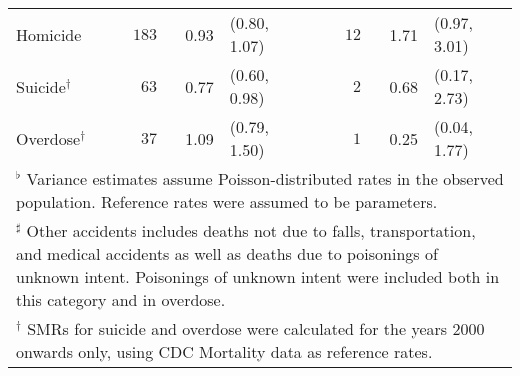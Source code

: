\documentclass[]{article}
\begin{document}
\begin{table}[H]
\begin{tabular}{lrrlcrrl}
  \hspace{10pt}Homicide & $183$ & 0.93 &  (0.80, 1.07) &  & $12$ & 1.71 &  (0.97, 3.01) \\ 
  \hspace{10pt}Suicide$^\dagger$ & $63$ & 0.77 &  (0.60, 0.98) &  & $2$ & 0.68 &  (0.17, 2.73) \\ 
  \hspace{10pt}Overdose$^\dagger$ & $37$ & 1.09 &  (0.79, 1.50) &  & $1$ & 0.25 &  (0.04, 1.77) \\ 
   \hline 
\multicolumn{8}{p{0.95\textwidth}}{\footnotesize$^\flat$ Variance estimates assume Poisson-distributed rates in the observed population. Reference rates were assumed to be parameters.}\\ 
\multicolumn{8}{p{0.95\textwidth}}{\footnotesize$^\sharp$ Other accidents includes deaths not due to falls, transportation, and medical accidents as well as deaths due to poisonings of unknown intent. Poisonings of unknown intent were included both in this category and in overdose.} \\\multicolumn{8}{p{0.95\textwidth}}{\footnotesize$^\dagger$ SMRs for suicide and overdose were calculated for the years 2000 onwards only, using CDC Mortality data as reference rates.}\\ \bottomrule
\end{tabular}
\end{table}
\end{document}
